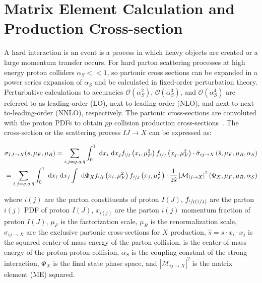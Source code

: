 \section{Matrix Element Calculation and Production Cross-section}
A hard interaction is an event is a process in which heavy objects are created or a large momentum transfer occurs.
For hard parton scattering processes at high energy proton colliders $\alpha_S << 1$, so partonic cross sections can be expanded in a power series expansion of $\alpha_S$ and be calculated in fixed-order perturbation theory. 
Perturbative calculations to accuracies $\mathcal{O}(\alpha^2_S)$, $\mathcal{O}(\alpha^3_S)$, and $\mathcal{O}(\alpha^4_S)$ are referred to as leading-order (LO), next-to-leading-order (NLO), and next-to-next-to-leading-order (NNLO), respectively.
The partonic cross-sections are convoluted with the proton PDFs to obtain $pp$ collision production cross-sections~\cite{BUCKLEY2011145}.
The cross-section or the scattering process $IJ \rightarrow X$ can be expressed as:
\begin{linenomath*}
\begin{align}
\sigma_{IJ \rightarrow X}(s, \mu_F, \mu_R) = \sum_{i, j = g, q, \bar{q}}^{} \int_{0}^{1} \mathrm{~d} x_i \mathrm{~d} x_j f_{\sfrac{i}{I}}\left(x_i, \mu_F^2\right) f_{\sfrac{j}{J}}\left(x_j, \mu_F^2\right) \cdot \hat{\sigma}_{i j \rightarrow X}\left(\hat{s}, \mu_F, \mu_R, \alpha_S\right) \\
=\sum_{i, j=g, q, \bar{q}} \int_{0}^{1} \mathrm{~d} x_i \mathrm{~d} x_j \int \mathrm{~d} \Phi_X f_{\sfrac{i}{I}}\left(x_i, \mu_F^2\right) f_{\sfrac{j}{J}}\left(x_j, \mu_F^2\right) \cdot \frac{1}{2 \hat{s}}\left\vert \mathcal{M}_{i j \rightarrow X}\right\vert^2\left(\Phi_X, \mu_F, \mu_R, \alpha_S\right)
\label{ttbar_crosssection}
\end{align}
\end{linenomath*}
where $i(j)$ are the parton constituents of proton $I(J)$, $f_{{\sfrac{i}{I}}({\sfrac{j}{J}})}$ are the parton $i(j)$ PDF of proton $I(J)$, $x_{i(j)}$ are the parton $i(j)$ momentum fraction of proton $I(J)$, $\mu_F$ is the factorization scale, $\mu_R$ is the renormalization scale, $\sigma_{i j \rightarrow X}$ are the exclusive partonic cross-sections for $X$ production, $\hat{s} = s \cdot x_i \cdot x_j$ is the squared center-of-mass energy of the parton collision, \beamenergy is the center-of-mass energy of the proton-proton collision, $\alpha_S$ is the coupling constant of the strong interaction, $\Phi_X$ is the final state phase space, and $\left\vert \mathcal{M}_{i j \rightarrow X}\right\vert^2$ is the matrix element (ME) squared.
